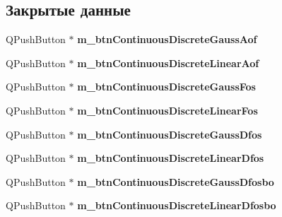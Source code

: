 \subsection*{Закрытые данные}
\begin{DoxyCompactItemize}
\item 
Q\+Push\+Button $\ast$ {\bfseries m\+\_\+btn\+Continuous\+Discrete\+Gauss\+Aof}\hypertarget{class_filter_start_buttons_box_a230951226cd8d50671fed030a7b0f615}{}\label{class_filter_start_buttons_box_a230951226cd8d50671fed030a7b0f615}

\item 
Q\+Push\+Button $\ast$ {\bfseries m\+\_\+btn\+Continuous\+Discrete\+Linear\+Aof}\hypertarget{class_filter_start_buttons_box_ad700eeed912667c328ac4e6ea37a6e1e}{}\label{class_filter_start_buttons_box_ad700eeed912667c328ac4e6ea37a6e1e}

\item 
Q\+Push\+Button $\ast$ {\bfseries m\+\_\+btn\+Continuous\+Discrete\+Gauss\+Fos}\hypertarget{class_filter_start_buttons_box_ab2caca5b2a08d8c4f3b48198d4f9091a}{}\label{class_filter_start_buttons_box_ab2caca5b2a08d8c4f3b48198d4f9091a}

\item 
Q\+Push\+Button $\ast$ {\bfseries m\+\_\+btn\+Continuous\+Discrete\+Linear\+Fos}\hypertarget{class_filter_start_buttons_box_aa26b0be9c1fb9ab3f82674e8698b3125}{}\label{class_filter_start_buttons_box_aa26b0be9c1fb9ab3f82674e8698b3125}

\item 
Q\+Push\+Button $\ast$ {\bfseries m\+\_\+btn\+Continuous\+Discrete\+Gauss\+Dfos}\hypertarget{class_filter_start_buttons_box_aa373a92abd69a3ef2530ee14d8057262}{}\label{class_filter_start_buttons_box_aa373a92abd69a3ef2530ee14d8057262}

\item 
Q\+Push\+Button $\ast$ {\bfseries m\+\_\+btn\+Continuous\+Discrete\+Linear\+Dfos}\hypertarget{class_filter_start_buttons_box_a12376691543adacbdcb9bf931e48cf75}{}\label{class_filter_start_buttons_box_a12376691543adacbdcb9bf931e48cf75}

\item 
Q\+Push\+Button $\ast$ {\bfseries m\+\_\+btn\+Continuous\+Discrete\+Gauss\+Dfosbo}\hypertarget{class_filter_start_buttons_box_af93590d952a8dbe78c6a6f21087d1f2c}{}\label{class_filter_start_buttons_box_af93590d952a8dbe78c6a6f21087d1f2c}

\item 
Q\+Push\+Button $\ast$ {\bfseries m\+\_\+btn\+Continuous\+Discrete\+Linear\+Dfosbo}\hypertarget{class_filter_start_buttons_box_a8edc659f1d9992cd61fe6b3cef7740c3}{}\label{class_filter_start_buttons_box_a8edc659f1d9992cd61fe6b3cef7740c3}


\end{DoxyCompactItemize}
